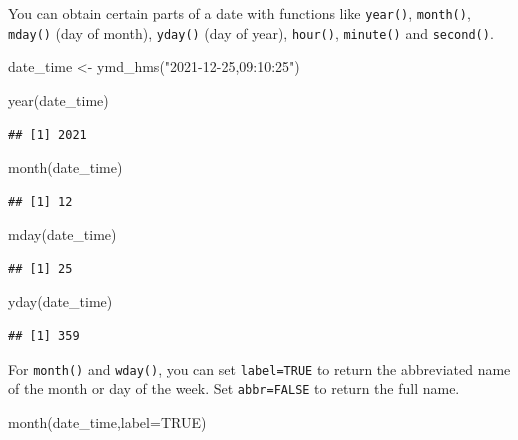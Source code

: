 \documentclass[
]{book}
\newenvironment{Shaded}{\begin{snugshade}}{\end{snugshade}}
\newcommand{\AttributeTok}[1]{\textcolor[rgb]{0.77,0.63,0.00}{#1}}
\newcommand{\ConstantTok}[1]{\textcolor[rgb]{0.00,0.00,0.00}{#1}}
\newcommand{\FunctionTok}[1]{\textcolor[rgb]{0.00,0.00,0.00}{#1}}
\newcommand{\NormalTok}[1]{#1}
\newcommand{\OtherTok}[1]{\textcolor[rgb]{0.56,0.35,0.01}{#1}}
\newcommand{\StringTok}[1]{\textcolor[rgb]{0.31,0.60,0.02}{#1}}
\begin{document}
You can obtain certain parts of a date with functions like \texttt{year()}, \texttt{month()}, \texttt{mday()} (day of month), \texttt{yday()} (day of year), \texttt{hour()}, \texttt{minute()} and \texttt{second()}.

\begin{Shaded}
\begin{Highlighting}[]
\NormalTok{date\_time }\OtherTok{\textless{}{-}} \FunctionTok{ymd\_hms}\NormalTok{(}\StringTok{"2021{-}12{-}25,09:10:25"}\NormalTok{)}

\FunctionTok{year}\NormalTok{(date\_time)}
\end{Highlighting}
\end{Shaded}

\begin{verbatim}
## [1] 2021
\end{verbatim}

\begin{Shaded}
\begin{Highlighting}[]
\FunctionTok{month}\NormalTok{(date\_time)}
\end{Highlighting}
\end{Shaded}

\begin{verbatim}
## [1] 12
\end{verbatim}

\begin{Shaded}
\begin{Highlighting}[]
\FunctionTok{mday}\NormalTok{(date\_time)}
\end{Highlighting}
\end{Shaded}

\begin{verbatim}
## [1] 25
\end{verbatim}

\begin{Shaded}
\begin{Highlighting}[]
\FunctionTok{yday}\NormalTok{(date\_time)}
\end{Highlighting}
\end{Shaded}

\begin{verbatim}
## [1] 359
\end{verbatim}

For \texttt{month()} and \texttt{wday()}, you can set \texttt{label=TRUE} to return the abbreviated name of the month or day of the week. Set \texttt{abbr=FALSE} to return the full name.

\begin{Shaded}
\begin{Highlighting}[]
\FunctionTok{month}\NormalTok{(date\_time,}\AttributeTok{label=}\ConstantTok{TRUE}\NormalTok{)}
\end{Highlighting}
\end{Shaded}
\end{document}

